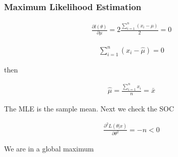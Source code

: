 \documentclass[
  shownotes,
  xcolor={svgnames},
  hyperref={colorlinks,citecolor=DarkBlue,linkcolor=DarkRed,urlcolor=DarkBlue}
  ]{beamer}
\begin{document}
\begin{frame}[fragile]
\frametitle{Maximum Likelihood Estimation}

\begin{align}
\frac{\partial l\left(\theta\right)}{\partial\mu}=2\frac{\sum_{i=1}^{n}\left(x_{i}-\mu\right)}{2}=0
\end{align}


\begin{align}
\sum_{i=1}^{n}\left(x_{i}-\hat{\mu}\right)=0
\end{align}

then

\begin{align}
\hat{\mu}=\frac{\sum_{i=1}^{n}x_{i}}{n}=\bar{x}
\end{align}

The MLE is the sample mean. Next we check the SOC


\begin{align}
\frac{\partial^2L(\theta|x)}{\partial \theta^2}=-n<0
\end{align}

We are in  a global maximum

\end{frame}
\end{document}
